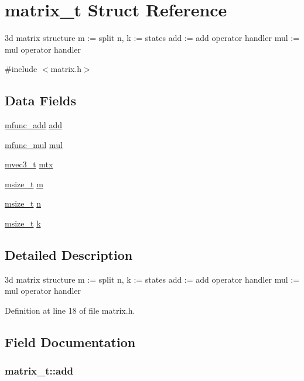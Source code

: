 \hypertarget{structmatrix__t}{\section{matrix\-\_\-t Struct Reference}
\label{structmatrix__t}
}


3d matrix structure m \-:= split n, k \-:= states add \-:= add operator handler mul \-:= mul operator handler  




{\ttfamily \#include $<$matrix.\-h$>$}

\subsection*{Data Fields}
\begin{DoxyCompactItemize}
\item 
\hyperlink{types_8h_a3472b426e98fe8245a0c3221c98d15a0}{mfunc\-\_\-add} \hyperlink{structmatrix__t_a9edaa57758ae90b18712bf19250e3b75}{add}
\item 
\hyperlink{types_8h_a8552194635c37d32de855f3b57657efa}{mfunc\-\_\-mul} \hyperlink{structmatrix__t_ab09e33ae0e047cb88a7e52120a4cf730}{mul}
\item 
\hyperlink{types_8h_a9979faa82cea27ed2d80c0e1fb916b35}{mvec3\-\_\-t} \hyperlink{structmatrix__t_ad4b17c5b56fb149bad1f3339468eb458}{mtx}
\item 
\hyperlink{types_8h_a4717ab46b712567c1482ad0f5b910027}{msize\-\_\-t} \hyperlink{structmatrix__t_a19674d4d094d4f933ac48186efb0090f}{m}
\item 
\hyperlink{types_8h_a4717ab46b712567c1482ad0f5b910027}{msize\-\_\-t} \hyperlink{structmatrix__t_a53ef69c811fd2c3065c1d4be804bceae}{n}
\item 
\hyperlink{types_8h_a4717ab46b712567c1482ad0f5b910027}{msize\-\_\-t} \hyperlink{structmatrix__t_a6e90ff9b85753d86727ee29c541d0ef2}{k}
\end{DoxyCompactItemize}


\subsection{Detailed Description}
3d matrix structure m \-:= split n, k \-:= states add \-:= add operator handler mul \-:= mul operator handler 

Definition at line 18 of file matrix.\-h.



\subsection{Field Documentation}
\hypertarget{structmatrix__t_a9edaa57758ae90b18712bf19250e3b75}{
\subsubsection[{add}]{ matrix\-\_\-t\-::add}}\label{structmatrix__t_a9edaa57758ae90b18712bf19250e3b75}


